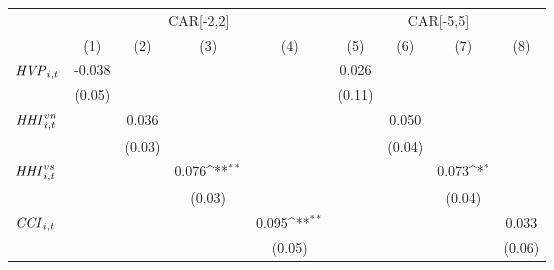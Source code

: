 {
\def\sym#1{\ifmmode^{#1}\else\(^{#1}\)\fi}
\begin{tabular}{l*{8}{c}}
\toprule
                    &\multicolumn{4}{c}{CAR[-2,2]}                                                          &\multicolumn{4}{c}{CAR[-5,5]}                                                          \\\cmidrule(lr){2-5}\cmidrule(lr){6-9}
                    &\multicolumn{1}{c}{(1)}         &\multicolumn{1}{c}{(2)}         &\multicolumn{1}{c}{(3)}         &\multicolumn{1}{c}{(4)}         &\multicolumn{1}{c}{(5)}         &\multicolumn{1}{c}{(6)}         &\multicolumn{1}{c}{(7)}         &\multicolumn{1}{c}{(8)}         \\
\midrule
${\it HVP}_{i,t}$   &      -0.038         &                     &                     &                     &       0.026         &                     &                     &                     \\
                    &      (0.05)         &                     &                     &                     &      (0.11)         &                     &                     &                     \\
${\it HHI}^{vn}_{i,t}$&                     &       0.036         &                     &                     &                     &       0.050         &                     &                     \\
                    &                     &      (0.03)         &                     &                     &                     &      (0.04)         &                     &                     \\
${\it HHI}^{vs}_{i,t}$&                     &                     &       0.076\sym{**} &                     &                     &                     &       0.073\sym{*}  &                     \\
                    &                     &                     &      (0.03)         &                     &                     &                     &      (0.04)         &                     \\
${\it CCI}_{i,t}$   &                     &                     &                     &       0.095\sym{**} &                     &                     &                     &       0.033         \\
                    &                     &                     &                     &      (0.05)         &                     &                     &                     &      (0.06)         \\

\end{tabular}}

